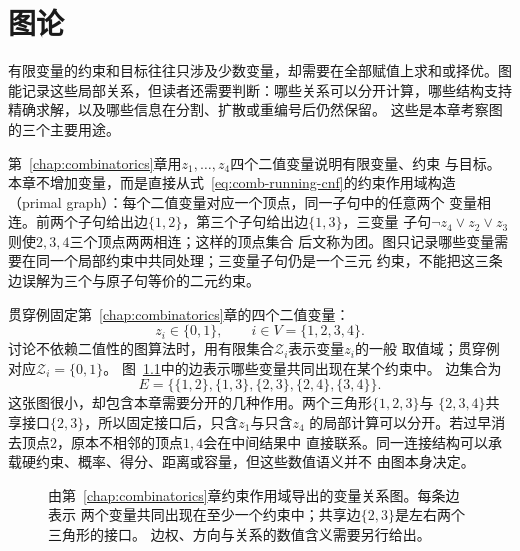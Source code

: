 \chapter{图论}
\label{chap:graph-theory}
有限变量的约束和目标往往只涉及少数变量，却需要在全部赋值上求和或择优。图能记录这些局部关系，但读者还需要判断：哪些关系可以分开计算，哪些结构支持精确求解，以及哪些信息在分割、扩散或重编号后仍然保留。
这些是本章考察图的三个主要用途。

第~\ref{chap:combinatorics}章用\(z_1,\ldots,z_4\)四个二值变量说明有限变量、约束
与目标。本章不增加变量，而是直接从式~\eqref{eq:comb-running-cnf}的约束作用域构造
（primal graph）：每个二值变量对应一个顶点，同一子句中的任意两个
变量相连。前两个子句给出边\(\{1,2\}\)，第三个子句给出边\(\{1,3\}\)，三变量
子句\(\neg z_4\lor z_2\lor z_3\)则使\(2,3,4\)三个顶点两两相连；这样的顶点集合
后文称为团。图只记录哪些变量需要在同一个局部约束中共同处理；三变量子句仍是一个三元
约束，不能把这三条边误解为三个与原子句等价的二元约束。

贯穿例固定第~\ref{chap:combinatorics}章的四个二值变量：
\[
  z_i\in\{0,1\},\qquad i\in V=\{1,2,3,4\}.
\]
讨论不依赖二值性的图算法时，用有限集合\(\mathcal{Z}_i\)表示变量\(z_i\)的一般
取值域；贯穿例对应\(\mathcal{Z}_i=\{0,1\}\)。
图~\ref{fig:graph-theory-running-graph}中的边表示哪些变量共同出现在某个约束中。
边集合为
\begin{equation}
  E=\bigl\{\{1,2\},\{1,3\},\{2,3\},\{2,4\},\{3,4\}\bigr\}.
  \label{eq:graph-theory-running-edges}
\end{equation}
这张图很小，却包含本章需要分开的几种作用。两个三角形\(\{1,2,3\}\)与
\(\{2,3,4\}\)共享接口\(\{2,3\}\)，所以固定接口后，只含\(z_1\)与只含\(z_4\)
的局部计算可以分开。若过早消去顶点\(2\)，原本不相邻的顶点\(1,4\)会在中间结果中
直接联系。同一连接结构可以承载硬约束、概率、得分、距离或容量，但这些数值语义并不
由图本身决定。

\begin{figure}[htbp]
  \centering
  \caption{由第~\ref{chap:combinatorics}章约束作用域导出的变量关系图。每条边表示
  两个变量共同出现在至少一个约束中；共享边\(\{2,3\}\)是左右两个三角形的接口。
  边权、方向与关系的数值含义需要另行给出。}
  \label{fig:graph-theory-running-graph}
\end{figure}

